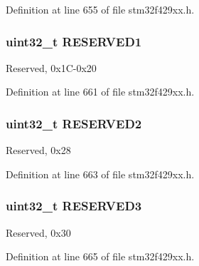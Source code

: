Definition at line 655 of file stm32f429xx.\+h.

\subsubsection[{\texorpdfstring{R\+E\+S\+E\+R\+V\+E\+D1}{RESERVED1}}]{\setlength{\rightskip}{0pt plus 5cm}uint32\+\_\+t R\+E\+S\+E\+R\+V\+E\+D1}\hypertarget{struct_l_t_d_c___type_def_a3c50f8698052818ea3024b4b52d65886}{}\label{struct_l_t_d_c___type_def_a3c50f8698052818ea3024b4b52d65886}
Reserved, 0x1\+C-\/0x20 

Definition at line 661 of file stm32f429xx.\+h.

\subsubsection[{\texorpdfstring{R\+E\+S\+E\+R\+V\+E\+D2}{RESERVED2}}]{\setlength{\rightskip}{0pt plus 5cm}uint32\+\_\+t R\+E\+S\+E\+R\+V\+E\+D2}\hypertarget{struct_l_t_d_c___type_def_aa4de71b2a578cce3a67229dde3c6b52d}{}\label{struct_l_t_d_c___type_def_aa4de71b2a578cce3a67229dde3c6b52d}
Reserved, 0x28 

Definition at line 663 of file stm32f429xx.\+h.

\subsubsection[{\texorpdfstring{R\+E\+S\+E\+R\+V\+E\+D3}{RESERVED3}}]{\setlength{\rightskip}{0pt plus 5cm}uint32\+\_\+t R\+E\+S\+E\+R\+V\+E\+D3}\hypertarget{struct_l_t_d_c___type_def_a41add28c14461ad6ca03e7311db7640a}{}\label{struct_l_t_d_c___type_def_a41add28c14461ad6ca03e7311db7640a}
Reserved, 0x30 

Definition at line 665 of file stm32f429xx.\+h.

